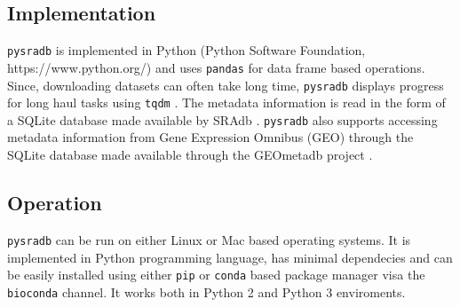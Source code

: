 \documentclass[9pt,a4paper]{extarticle}
\begin{document}
\subsection*{Implementation}
\texttt{pysradb} is implemented in Python (Python Software Foundation, https://www.python.org/) \cite{vanRossum:2011:PLR:2011965}
and uses \texttt{pandas} \cite{mckinney-proc-scipy-2010} for
data frame based operations. Since, downloading datasets can often take long time,
\texttt{pysradb} displays progress for long haul tasks using \texttt{tqdm} \cite{casper_da_costa_luis_2018_1211527}.
The metadata information is read in the form of a SQLite \cite{about_sqlite} database made available by SRAdb \cite{zhu2013sradb}. \texttt{pysradb} also supports accessing metadata 
information from Gene Expression Omnibus (GEO)
 \cite{edgar2002gene,barrett2012ncbi} through the SQLite database made available 
through the GEOmetadb project \cite{zhu2008geometadb}.


\subsection*{Operation}

\texttt{pysradb} can be run on either Linux or Mac based operating systems. It is 
implemented in Python programming language, has minimal dependecies and can be easily installed using either \texttt{pip} or \texttt{conda} based package manager visa the \texttt{bioconda} \cite{gruning2018bioconda} channel. It works both in Python 2 and Python 3 enviroments.

\begin{comment}


\section*{Results} %
This section is only required if the paper includes novel data or analyses, and should be written as a traditional results section.
\end{comment}
\end{document}
